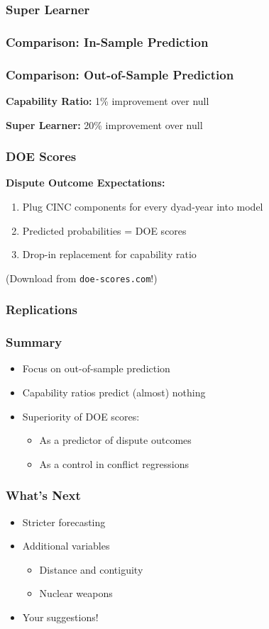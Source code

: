 \documentclass{beamer}
\begin{document}
\begin{frame}
  \frametitle{Super Learner}

  
\end{frame}

\begin{frame}
  \frametitle{Comparison: In-Sample Prediction}

  
\end{frame}

\begin{frame}
  \frametitle{Comparison: Out-of-Sample Prediction}

  \textbf{Capability Ratio:} 1\% improvement over null
  
  \bigskip%
  \textbf{Super Learner:} 20\% improvement over null
\end{frame}

\begin{frame}
  \frametitle{DOE Scores}

  \textbf{Dispute Outcome Expectations:}
  \begin{enumerate}
    \item Plug CINC components for every dyad-year into model
    \item Predicted probabilities = DOE scores
    \item Drop-in replacement for capability ratio
  \end{enumerate}

  (Download from \texttt{doe-scores.com}!)
\end{frame}

\begin{frame}
  \frametitle{Replications}

  
\end{frame}

\begin{frame}
  \frametitle{Summary}

  \begin{itemize}
    \item Focus on out-of-sample prediction
    \item Capability ratios predict (almost) nothing
    \item Superiority of DOE scores:
    \begin{itemize}
      \item As a predictor of dispute outcomes
      \item As a control in conflict regressions
    \end{itemize}
  \end{itemize}
\end{frame}

\begin{frame}
  \frametitle{What's Next}

  \begin{itemize}
    \item Stricter forecasting
    \item Additional variables
    \begin{itemize}
      \item Distance and contiguity
      \item Nuclear weapons
    \end{itemize}
    \item Your suggestions!
  \end{itemize}
\end{frame}
\end{document}
